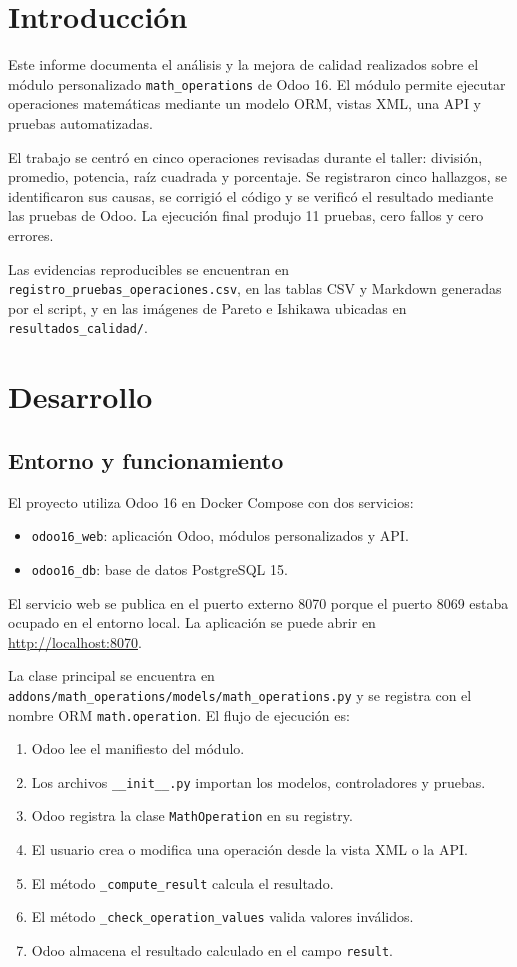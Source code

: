 \documentclass{article}
\begin{document}
\section{Introducción}
Este informe documenta el análisis y la mejora de calidad realizados sobre el módulo personalizado \texttt{math\_operations} de Odoo 16. El módulo permite ejecutar operaciones matemáticas mediante un modelo ORM, vistas XML, una API y pruebas automatizadas.

El trabajo se centró en cinco operaciones revisadas durante el taller: división, promedio, potencia, raíz cuadrada y porcentaje. Se registraron cinco hallazgos, se identificaron sus causas, se corrigió el código y se verificó el resultado mediante las pruebas de Odoo. La ejecución final produjo 11 pruebas, cero fallos y cero errores.

Las evidencias reproducibles se encuentran en \texttt{registro\_pruebas\_operaciones.csv}, en las tablas CSV y Markdown generadas por el script, y en las imágenes de Pareto e Ishikawa ubicadas en \texttt{resultados\_calidad/}.

\section{Desarrollo}
\subsection{Entorno y funcionamiento}
El proyecto utiliza Odoo 16 en Docker Compose con dos servicios:
\begin{itemize}[leftmargin=*]
  \item \texttt{odoo16\_web}: aplicación Odoo, módulos personalizados y API.
  \item \texttt{odoo16\_db}: base de datos PostgreSQL 15.
\end{itemize}

El servicio web se publica en el puerto externo 8070 porque el puerto 8069 estaba ocupado en el entorno local. La aplicación se puede abrir en \url{http://localhost:8070}.

La clase principal se encuentra en \texttt{addons/math\_operations/models/math\_operations.py} y se registra con el nombre ORM \texttt{math.operation}. El flujo de ejecución es:
\begin{enumerate}[leftmargin=*]
  \item Odoo lee el manifiesto del módulo.
  \item Los archivos \texttt{__init__.py} importan los modelos, controladores y pruebas.
  \item Odoo registra la clase \texttt{MathOperation} en su registry.
  \item El usuario crea o modifica una operación desde la vista XML o la API.
  \item El método \texttt{\_compute\_result} calcula el resultado.
  \item El método \texttt{\_check\_operation\_values} valida valores inválidos.
  \item Odoo almacena el resultado calculado en el campo \texttt{result}.
\end{enumerate}
\end{document}
